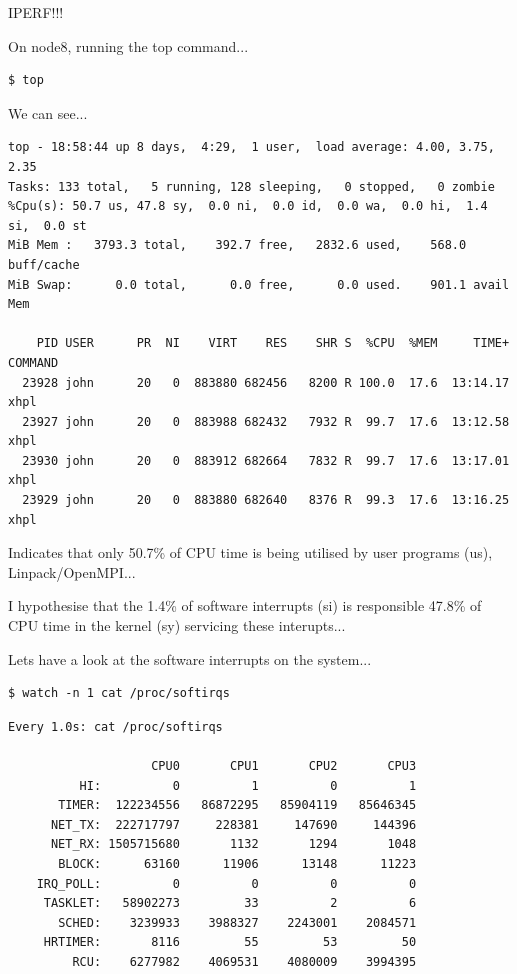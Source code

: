 \documentclass{report}
\begin{document}
IPERF!!!

On node8, running the top command...

\lstset{style=type}
\begin{lstlisting}
$ top
\end{lstlisting}

We can see...

\lstset{style=type}
\begin{lstlisting}
top - 18:58:44 up 8 days,  4:29,  1 user,  load average: 4.00, 3.75, 2.35
Tasks: 133 total,   5 running, 128 sleeping,   0 stopped,   0 zombie
%Cpu(s): 50.7 us, 47.8 sy,  0.0 ni,  0.0 id,  0.0 wa,  0.0 hi,  1.4 si,  0.0 st
MiB Mem :   3793.3 total,    392.7 free,   2832.6 used,    568.0 buff/cache
MiB Swap:      0.0 total,      0.0 free,      0.0 used.    901.1 avail Mem 

    PID USER      PR  NI    VIRT    RES    SHR S  %CPU  %MEM     TIME+ COMMAND                                                   
  23928 john      20   0  883880 682456   8200 R 100.0  17.6  13:14.17 xhpl                                                      
  23927 john      20   0  883988 682432   7932 R  99.7  17.6  13:12.58 xhpl                                                      
  23930 john      20   0  883912 682664   7832 R  99.7  17.6  13:17.01 xhpl                                                      
  23929 john      20   0  883880 682640   8376 R  99.3  17.6  13:16.25 xhpl  
\end{lstlisting}

Indicates that only 50.7\% of CPU time is being utilised by user programs (us), Linpack/OpenMPI...

I hypothesise that the 1.4\% of software interrupts (si) is responsible 47.8\% of CPU time in the kernel (sy) servicing these interupts...

Lets have a look at the software interrupts on the system...

\lstset{style=type}
\begin{lstlisting}
$ watch -n 1 cat /proc/softirqs
\end{lstlisting}


\lstset{style=type}
\begin{lstlisting}
Every 1.0s: cat /proc/softirqs

                    CPU0       CPU1       CPU2       CPU3
          HI:          0          1          0          1
       TIMER:  122234556   86872295   85904119   85646345
      NET_TX:  222717797     228381     147690     144396
      NET_RX: 1505715680       1132       1294       1048
       BLOCK:      63160      11906      13148      11223
    IRQ_POLL:          0          0          0          0
     TASKLET:   58902273         33          2          6
       SCHED:    3239933    3988327    2243001    2084571
     HRTIMER:       8116         55         53         50
         RCU:    6277982    4069531    4080009    3994395
\end{lstlisting}
\end{document}
